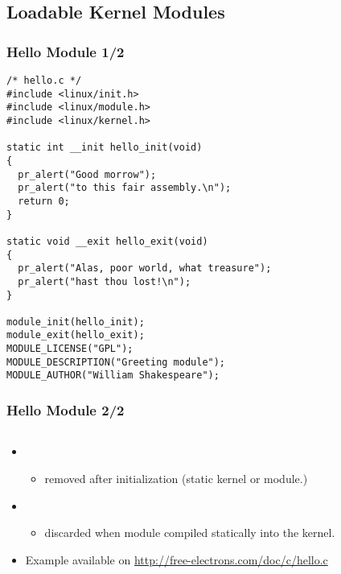 \subsection{Loadable Kernel Modules}

\begin{frame}[fragile]
  \frametitle{Hello Module 1/2}
\begin{verbatim}
/* hello.c */
#include <linux/init.h>
#include <linux/module.h>
#include <linux/kernel.h>

static int __init hello_init(void)
{
  pr_alert("Good morrow");
  pr_alert("to this fair assembly.\n");
  return 0;
}

static void __exit hello_exit(void)
{
  pr_alert("Alas, poor world, what treasure");
  pr_alert("hast thou lost!\n");
}

module_init(hello_init);
module_exit(hello_exit);
MODULE_LICENSE("GPL");
MODULE_DESCRIPTION("Greeting module");
MODULE_AUTHOR("William Shakespeare");  
\end{verbatim}
\end{frame}

\begin{frame}[fragile]
  \frametitle{Hello Module 2/2}
\begin{verbatim}
\end{verbatim}

\begin{itemize}
\item {}
  \begin{itemize}
  \item removed after initialization (static kernel or module.)
  \end{itemize}
\item {}
  \begin{itemize}
  \item discarded when module compiled statically into the kernel.
  \end{itemize}
\item Example available on
  \url{http://free-electrons.com/doc/c/hello.c}
\end{itemize}
\end{frame}

